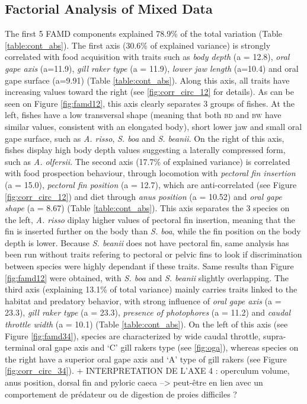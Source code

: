 
\subsection{Factorial Analysis of Mixed Data}

The first 5 FAMD components explained 78.9\% of the total variation (Table \ref{table:cont_abs}). The first axis (30.6\% of explained variance) is strongly correlated with food acquisition with traits such as \emph{body depth} (a = 12.8), \emph{oral gape axis} (a=11.9), \emph{gill raker type} (a = 11.9), \emph{lower jaw length} (a=10.4) and oral gape surface (a=9.91) (Table \ref{table:cont_abs}). Along this axis, all traits have increasing values toward the right (see \ref{fig:corr_circ_12} for details). As can be seen on Figure \ref{fig:famd12}, this axis clearly separates 3 groups of fishes. At the left, fishes have a low transversal shape (meaning that both \textsc{bd} and \textsc{bw} have similar values, consistent with an elongated body), short lower jaw and small oral gape surface, such as \textit{A. risso}, \textit{S. boa} and \textit{S. beanii}. On the right of this axis, fishes display high body depth values suggesting a laterally compressed form, such as \textit{A. olfersii}. 
The second axis (17.7\% of explained variance) is correlated with food prospection behaviour, through locomotion with \emph{pectoral fin insertion} (a = 15.0), \emph{pectoral fin position} (a = 12.7), which are anti-correlated (see Figure \ref{fig:corr_circ_12}) and diet through \emph{anus position} (a = 10.52) and \emph{oral gape shape} (a = 8.67) (Table \ref{table:cont_abs}). This axis separates the 3 species on the left, \textit{A. risso} diplay higher values of pectoral fin insertion, meaning that the fin is inserted further on the body than \textit{S. boa}, while the fin position on the body depth is lower. Because \textit{S. beanii} does not have pectoral fin, same analysis has been run without traits refering to pectoral or pelvic fins to look if discrimination between species were highly dependant if these traits. Same results than Figure \ref{fig:famd12} were obtained, with \textit{S. boa} and \textit{S. beanii} slightly overlapping. 
The third axis (explaining 13.1\% of total variance) mainly carries traits linked to the habitat and predatory behavior, with strong influence of \emph{oral gape axis} (a = 23.3), \emph{gill raker type} (a = 23.3), \emph{presence of photophores} (a = 11.2) and \emph{caudal throttle width} (a = 10.1) (Table \ref{table:cont_abs}). On the left of this axis (see Figure \ref{fig:famd34}), species are characterized by wide caudal throttle, supra-terminal oral gape axis and `C' gill rakers type (see \ref{fig:oga}), whereas species on the right have a superior oral gape axis and `A' type of gill rakers (see Figure \ref{fig:corr_circ_34}).
+ INTERPRETATION DE L'AXE 4 : operculum volume, anus position, dorsal fin and pyloric caeca --> peut-être en lien avec un comportement de prédateur ou de digestion de proies difficiles ?  

